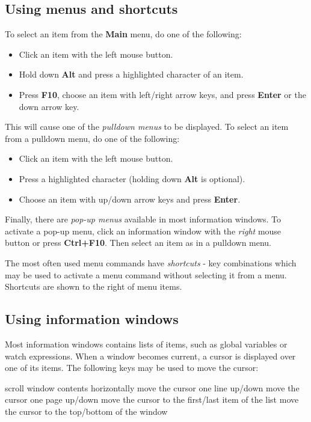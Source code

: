 \subsection{Using menus and shortcuts}
\label{dialog:intro:menus}

To select an item from the {\bf Main} menu, do one of the following:
\begin{itemize}
\item Click an item with the left mouse button.
\item Hold down {\bf Alt} and press a highlighted character of an item.
\item Press {\bf F10}, choose an item with left/right arrow keys,
and press {\bf Enter} or the down arrow key.
\end{itemize}
This will cause one of the {\em pulldown menus} to be displayed. To select
an item from a pulldown menu, do one of the following:
\begin{itemize}
\item Click an item with the left mouse button.
\item Press a highlighted character (holding down {\bf Alt} is optional).
\item Choose an item with up/down arrow keys and press {\bf Enter}.
\end{itemize}
Finally, there are {\em pop-up menus} available in most information windows.
To activate a pop-up menu, click an information window with the {\em right} mouse button
or press {\bf Ctrl+F10}. Then select an item as in a pulldown menu.

The most often used menu commands have {\em shortcuts} - key combinations
which may be used to activate a menu command without selecting it from a menu.
Shortcuts are shown to the right of menu items.

\subsection{Using information windows}
\label{dialog:intro:info}

Most information windows contains lists of items, such as global variables
or watch expressions. When a window becomes current, a cursor is displayed
over one of its items. The following keys may be used to move the cursor:

\KeyListBegin{8 cm}
     {scroll window contents horizontally}
        {move the cursor one line up/down}
      {move the cursor one page up/down}
 {move the cursor to the first/last item of the list}
  {move the cursor to the top/bottom of the window}
\KeyListEnd


